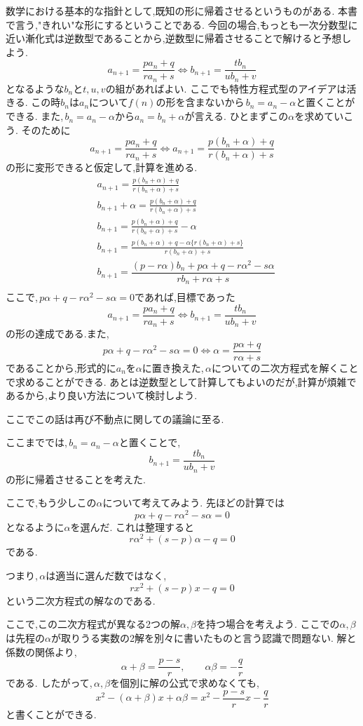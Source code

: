 数学における基本的な指針として,既知の形に帰着させるというものがある.
本書で言う,"きれい"な形にするということである.
今回の場合,もっとも一次分数型に近い漸化式は逆数型であることから,逆数型に帰着させることで解けると予想しよう.
\[
  a_{n+1}=\frac{pa_n+q}{ra_n+s} \Leftrightarrow b_{n+1}=\frac{tb_n}{u b_n+v}
\]
となるような$b_n$と$t,u,v$の組があればよい.
ここでも特性方程式型のアイデアは活きる.
この時$b_n$は$a_n$について$f(n)$の形を含まないから\,$b_n=a_n-\alpha$と置くことができる.
また,\,$b_n=a_n-\alpha$から$a_n=b_n+\alpha$が言える.
ひとまずこの$\alpha$を求めていこう.
そのために
\[
  a_{n+1}=\frac{pa_n+q}{ra_n+s} \Leftrightarrow a_{n+1}=\frac{p(b_n+\alpha)+q}{r(b_n+\alpha)+s}
\]
の形に変形できると仮定して,計算を進める.
\begin{align*}
   & a_{n+1}=\frac{p(b_n+\alpha)+q}{r(b_n+\alpha)+s}                                  \\
   & b_{n+1}+\alpha=\frac{p(b_n+\alpha)+q}{r(b_n+\alpha)+s}                           \\
   & b_{n+1}=\frac{p(b_n+\alpha)+q}{r(b_n+\alpha)+s}-\alpha                           \\
   & b_{n+1}=\frac{p(b_n+\alpha)+q-\alpha\{r(b_n+\alpha)+s\}}{r(b_n+\alpha)+s}        \\
   & b_{n+1}=\dfrac{(p-r\alpha)b_{n}+p\alpha+q-r\alpha^{2}-s\alpha}{rb_{n}+r\alpha+s} \\
\end{align*}
ここで,\,$p\alpha+q-r\alpha^{2}-s\alpha=0$であれば,目標であった
\[
  a_{n+1}=\frac{pa_n+q}{ra_n+s} \Leftrightarrow b_{n+1}=\frac{tb_n}{u b_n+v}
\]
の形の達成である.また,
\[
  p\alpha+q-r\alpha^{2}-s\alpha=0 \Leftrightarrow \alpha=\frac{p\alpha+q}{r\alpha+s}
\]
であることから,形式的に$a_n$を$\alpha$に置き換えた,\,$\alpha$についての二次方程式を解くことで求めることができる.
あとは逆数型として計算してもよいのだが,計算が煩雑であるから,より良い方法について検討しよう.

ここでこの話は再び不動点に関しての議論に至る.

ここまででは,\,$b_n=a_n-\alpha$と置くことで,
\[
  b_{n+1}=\frac{tb_n}{ub_n+v}
\]
の形に帰着させることを考えた.

ここで,もう少しこの$\alpha$について考えてみよう.
先ほどの計算では
\[
  p\alpha+q-r\alpha^2-s\alpha=0
\]
となるように$\alpha$を選んだ.
これは整理すると
\[
  r\alpha^2+(s-p)\alpha-q=0
\]
である.

つまり,\,$\alpha$は適当に選んだ数ではなく,
\[
  rx^2+(s-p)x-q=0
\]
という二次方程式の解なのである.

ここで,この二次方程式が異なる2つの解$\alpha,\beta$を持つ場合を考えよう.
ここでの$\alpha,\beta$は先程の$\alpha$が取りうる実数の2解を別々に書いたものと言う認識で問題ない.
解と係数の関係より,
\[
  \alpha+\beta=\frac{p-s}{r},
  \qquad
  \alpha\beta=-\frac qr
\]
である.
したがって,\,$\alpha,\beta$を個別に解の公式で求めなくても,
\[
  x^2-(\alpha+\beta)x+\alpha\beta
  =
  x^2-\frac{p-s}{r}x-\frac qr
\]
と書くことができる.

